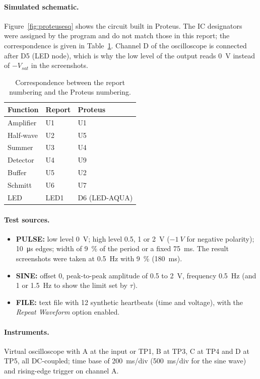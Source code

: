 \documentclass[11pt,letterpaper]{article}
\newcommand{\Vsat}{V_{sat}}
\begin{document}
\paragraph{Simulated schematic.} Figure~\ref{fig:proteusesq} shows the circuit built in Proteus. The IC designators were assigned by the program and do not match those in this report; the correspondence is given in Table~\ref{tab:equiv}. Channel D of the oscilloscope is connected after D5 (LED node), which is why the low level of the output reads \SI{0}{V} instead of $-\Vsat$ in the screenshots.

\begin{table}[H]
\centering
\caption{Correspondence between the report numbering and the Proteus numbering.}\label{tab:equiv}
\begin{tabular}{@{}lll@{}}
\toprule
Function & Report & Proteus \\
\midrule
Amplifier & U1 & U1 \\
Half-wave & U2 & U5 \\
Summer & U3 & U4 \\
Detector & U4 & U9 \\
Buffer & U5 & U2 \\
Schmitt & U6 & U7 \\
LED & LED1 & D6 (LED-AQUA) \\
\bottomrule
\end{tabular}
\end{table}

\paragraph{Test sources.}
\begin{itemize}
  \item \textbf{PULSE:} low level \SI{0}{V}; high level 0.5, 1 or \SI{2}{V} ($-\SI{1}{V}$ for negative polarity); \SI{10}{\micro s} edges; width of \SI{9}{\percent} of the period or a fixed \SI{75}{ms}. The result screenshots were taken at \SI{0.5}{Hz} with \SI{9}{\percent} (\SI{180}{ms}).
  \item \textbf{SINE:} offset 0, peak-to-peak amplitude of 0.5 to \SI{2}{V}, frequency \SI{0.5}{Hz} (and 1 or \SI{1.5}{Hz} to show the limit set by $\tau$).
  \item \textbf{FILE:} text file with 12 synthetic heartbeats (time and voltage), with the \emph{Repeat Waveform} option enabled.
\end{itemize}

\paragraph{Instruments.} Virtual oscilloscope with A at the input or TP1, B at TP3, C at TP4 and D at TP5, all DC-coupled; time base of \SI{200}{ms/div} (\SI{500}{ms/div} for the sine wave) and rising-edge trigger on channel A.
\end{document}
